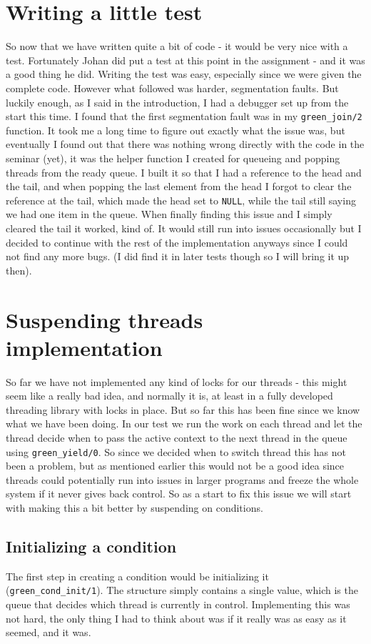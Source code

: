 \documentclass[a4paper, 12pt]{article}
\def\code#1{\texttt{#1}}
\begin{document}
\section{Writing a little test}
So now that we have written quite a bit of code - it would be very nice with a test. Fortunately Johan did put a test at this point in the assignment - and it was a good thing he did. Writing the test was easy, especially since we were given the complete code. However what followed was harder, segmentation faults. But luckily enough, as I said in the introduction,  I had a debugger set up from the start this time. I found that the first segmentation fault was in my \code{green\_join/2} function. It took me a long time to figure out exactly what the issue was, but eventually I found out that there was nothing wrong directly with the code in the seminar (yet), it was the helper function I created for queueing and popping threads from the ready queue. I built it so that I had a reference to the head and the tail, and when popping the last element from the head I forgot to clear the reference at the tail, which made the head set to \code{NULL}, while the tail still saying we had one item in the queue. When finally finding this issue and I simply cleared the tail it worked, kind of. It would still run into issues occasionally but I decided to continue with the rest of the implementation anyways since I could not find any more bugs. (I did find it in later tests though so I will bring it up then).

\section{Suspending threads implementation}
So far we have not implemented any kind of locks for our threads - this might seem like a really bad idea, and normally it is, at least in a fully developed threading library with locks in place. But so far this has been fine since we know what we have been doing. In our test we run the work on each thread and let the thread decide when to pass the active context to the next thread in the queue using \code{green\_yield/0}. So since we decided when to switch thread this has not been a problem, but as mentioned earlier this would not be a good idea since threads could potentially run into issues in larger programs and freeze the whole system if it never gives back control. So as a start to fix this issue we will start with making this a bit better by suspending on conditions.

\subsection{Initializing a condition}
The first step in creating a condition would be initializing it (\code{green\_cond\_init/1}). The structure simply contains a single value, which is the queue that decides which thread is currently in control. Implementing this was not hard, the only thing I had to think about was if it really was as easy as it seemed, and it was.
\end{document}
